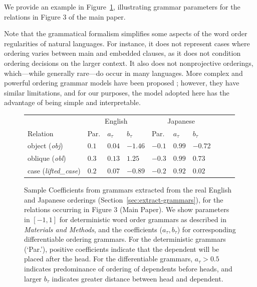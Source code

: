 \documentclass[10pt,twoside,lineno]{article}
\begin{document}
We provide an example in Figure~\ref{fig:grammar-sample}, illustrating grammar parameters for the relations in Figure 3 of the main paper.

Note that the grammatical formalism simplifies some aspects of the word order regularities of natural languages.
For instance, it does not represent cases where ordering varies between main and embedded clauses, as it does not condition ordering decisions on the larger context.
It also does not nonprojective orderings, which---while generally rare---do occur in many languages.
More complex and powerful ordering grammar models have been proposed \cite{futrell2015experiments,wang2016galactic}; however, they have similar limitations, and for our purposes, the model adopted here has the advantage of being simple and interpretable.



\begin{figure}
	\begin{center}
\begin{tabular}{l||l|ll||l|lllll}
	& \multicolumn{3}{c||}{English}    &  \multicolumn{3}{c}{Japanese}  \\ 
	Relation                     &  Par.   & $a_\tau$ & $b_\tau$            & Par.   & $a_\tau$ & $b_\tau$     \\ \hline \hline
	object (\textit{obj})        &  $0.1$   &   $0.04$   & $-1.46$            & $-0.1$  & $0.99$ & $-0.7$2 \\
	oblique (\textit{obl})       &  $0.3$   &   $0.13$     & $1.25$             & $-0.3$  & $0.99$ & $0.73$ \\
	case (\textit{lifted\_case}) &  $0.2$   &   $0.07$       &   $-0.89$         & $-0.2$  &  $0.92$ & $0.02$  \\
\end{tabular}
	\end{center}
	\caption{Sample Coefficients from grammars extracted from the real English and Japanese orderings (Section~\ref{sec:extract-grammars}), for the relations occurring in Figure 3 (Main Paper). We show parameters in $[-1,1]$ for deterministic word order grammars as described in \emph{Materials and Methods}, and the coefficients ($a_\tau, b_\tau$) for corresponding differentiable ordering grammars. For the deterministic grammars (`Par.'), positive coefficients indicate that the dependent will be placed after the head. For the differentiable grammars, $a_\tau > 0.5$ indicates predominance of ordering of dependents before heads, and larger $b_\tau$ indicates greater distance between head and dependent.}\label{fig:grammar-sample}
\end{figure}
\end{document}
